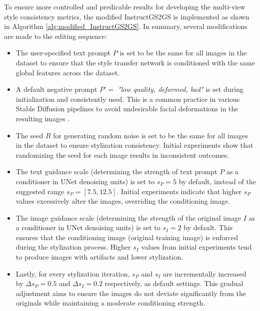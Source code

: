 To ensure more controlled and predicable results for developing the multi-view style consistency metrics, the modified InstructGS2GS is implemented as shown in Algorithm \ref{alg:modified_InstructGS2GS}. In summary, several modifications are made to the editing sequence:
\begin{itemize}
	\item The user-specified text prompt $P$ is set to be the same for all images in the dataset to ensure that the style transfer network is conditioned with the same global features across the dataset.

	\item A default negative prompt $P' =$ \textit{"low quality, deformed, bad"} is set during initialization and consistently used. This is a common practice in various Stable Diffusion pipelines to avoid undesirable facial deformations in the resulting images \citep{Ban.2024}.

	\item The seed $R$ for generating random noise is set to be the same for all images in the dataset to ensure stylization consistency. Initial experiments show that randomizing the seed for each image results in inconsistent outcomes.

	\item The text guidance scale (determining the strength of text prompt $P$ as a conditioner in UNet denoising units) is set to $s_P = 5$ by default, instead of the suggested range $s_P = [7.5, 12.5]$. Initial experiments indicate that higher $s_P$ values excessively alter the images, overriding the conditioning image.

	\item The image guidance scale (determining the strength of the original image $I$ as a conditioner in UNet denoising units) is set to $s_I = 2$ by default. This ensures that the conditioning image (original training image) is enforced during the stylization process. Higher $s_I$ values from initial experiments tend to produce images with artifacts and lower stylization.

	\item Lastly, for every stylization iteration, $s_P$ and $s_I$ are incrementally increased by $\Delta s_P = 0.5$ and $\Delta s_I = 0.2$ respectively, as default settings. This gradual adjustment aims to ensure the images do not deviate significantly from the originals while maintaining a moderate conditioning strength.
\end{itemize}


